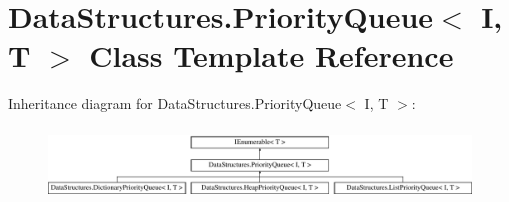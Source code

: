 \hypertarget{class_data_structures_1_1_priority_queue}{}\section{Data\+Structures.\+Priority\+Queue$<$ I, T $>$ Class Template Reference}
\label{class_data_structures_1_1_priority_queue}
Inheritance diagram for Data\+Structures.\+Priority\+Queue$<$ I, T $>$\+:\begin{figure}[H]
\begin{center}
\leavevmode
\includegraphics[height=1.944444cm]{class_data_structures_1_1_priority_queue}
\end{center}
\end{figure}
